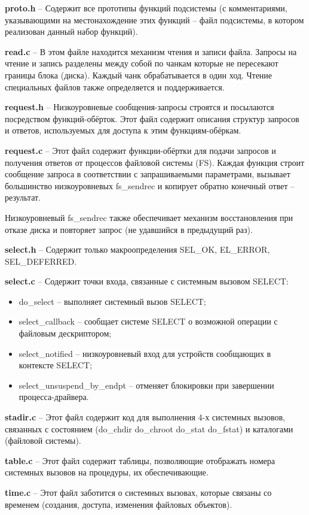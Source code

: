 \textbf{proto.h} -- Содержит все прототипы функций подсистемы (с комментариями, указывающими на местонахождение этих функций -- файл подсистемы, в котором реализован данный набор функций).

\textbf{read.c} -- В этом файле находится механизм чтения и записи файла. Запросы на чтение и запись разделены между собой по чанкам которые не пересекают границы блока (диска). Каждый чанк обрабатывается в один ход. Чтение специальных файлов также определяется и поддерживается.

\textbf{request.h} -- Низкоуровневые сообщения-запросы строятся и посылаются посредством функций-обёрток. Этот файл содержит описания структур запросов и ответов, используемых для доступа к этим функциям-обёркам.

\textbf{request.c} -- Этот файл содержит функции-обёртки для подачи запросов и получения ответов от процессов файловой системы (FS). Каждая функция строит сообщение запроса в соответствии с запрашиваемыми параметрами, вызывает большинство низкоуровневых fs\_sendrec и копирует обратно конечный ответ -- результат.

Низкоуровневый fs\_sendrec также обеспечивает механизм восстановления при отказе диска и повторяет запрос (не удавшийся в предыдущий раз).

\textbf{select.h} -- Содержит только макроопределения SEL\_OK, EL\_ERROR, SEL\_DEFERRED.

\textbf{select.c} -- Содержит точки входа, связанные с системным вызовом SELECT:
\begin{itemize}
\item do\_select -- выполняет системный вызов SELECT;
\item select\_callback -- сообщает системе SELECT о возможной операции с файловым дескриптором;
\item select\_notified -- низкоуровневый вход для устройств сообщающих в контексте  SELECT;
\item select\_unsuspend\_by\_endpt -- отменяет блокировки при завершении процесса-драйвера.
\end{itemize}

\textbf{stadir.c} -- Этот файл содержит код для выполнения 4-х системных вызовов, связанных с состоянием (do\_chdir do\_chroot do\_stat do\_fstat) и каталогами (файловой системы).

\textbf{table.c} -- Этот файл содержит таблицы, позволяющие отображать номера системных вызовов на процедуры, их обеспечивающие.

\textbf{time.c} -- Этот файл заботится о системных вызовах, которые связаны со временем (создания, доступа, изменения файловых объектов).

